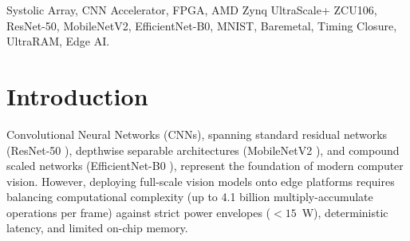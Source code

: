 \documentclass[10pt,journal,compsoc]{IEEEtran}
\begin{document}
{\begin{abstract}
We achieve 100\% clean physical timing closure across both precisions: at 8-bit precision, the core operates at 75.0~MHz with Worst Negative Slack (WNS) of $+0.625$~ns and Total Negative Slack (TNS) of $0.000$~ns; at 16-bit precision, it operates at 70.0~MHz with WNS of $+0.079$~ns and TNS of $0.000$~ns (zero failing endpoints). Complete behavioral simulation and baremetal board-level evaluation verify 100\% correct Top-1 classification accuracy matching software floating-point baselines.
\end{abstract}

\begin{IEEEkeywords}
Systolic Array, CNN Accelerator, FPGA, AMD Zynq UltraScale+ ZCU106, ResNet-50, MobileNetV2, EfficientNet-B0, MNIST, Baremetal, Timing Closure, UltraRAM, Edge AI.
\end{IEEEkeywords}}

\maketitle
\IEEEdisplaynontitleabstractindextext
\IEEEpeerreviewmaketitle

\section{Introduction}
 Convolutional Neural Networks (CNNs), spanning standard residual networks (ResNet-50 \cite{he2016deep}), depthwise separable architectures (MobileNetV2 \cite{sandler2018mobilenetv2}), and compound scaled networks (EfficientNet-B0 \cite{tan2019efficientnet}), represent the foundation of modern computer vision. However, deploying full-scale vision models onto edge platforms requires balancing computational complexity (up to 4.1 billion multiply-accumulate operations per frame) against strict power envelopes ($< 15$~W), deterministic latency, and limited on-chip memory.
\end{document}

